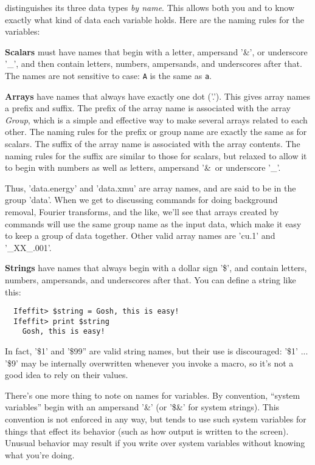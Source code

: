 \documentclass[11pt]{article}
\begin{document}
{\ifeffit} distinguishes its three data types {\emph{by name}}. This allows
both you and {\ifeffit} to know exactly what kind of data each variable
holds.  Here are the naming rules for the variables:

{\bf{Scalars}} must have names that begin with a letter, ampersand '\&', or
underscore '\_', and then contain letters, numbers, ampersands, and
underscores after that.  The names are not sensitive to case: {\tt{A}} is
the same as {\tt{a}}.


{\bf{Arrays}} have names that always have exactly one dot ('.').  This
gives array names a prefix and suffix.  The prefix of the array name is
associated with the array {\emph{Group}}, which is a simple and effective
way to make several arrays related to each other.  The naming rules for the
prefix or group name are exactly the same as for scalars.  The suffix of
the array name is associated with the array contents.  The naming rules for
the suffix are similar to those for scalars, but relaxed to allow it to
begin with numbers as well as letters, ampersand '\&\, or underscore '\_'.

Thus, 'data.energy' and 'data.xmu' are array names, and are said to be in
the group 'data'.  When we get to discussing commands for doing background
removal, Fourier transforms, and the like, we'll see that arrays created by
{\ifeffit} commands will use the same group name as the input data, which
make it easy to keep a group of data together.  Other valid array names are
'cu.1' and '\_XX\_.001'.

{\bf{Strings}} have names that always begin with a dollar sign '\$', and
contain letters, numbers, ampersands, and underscores after that.  You can
define a string like this:
{\small\begin{verbatim}
  Ifeffit> $string = Gosh, this is easy!
  Ifeffit> print $string
    Gosh, this is easy!
\end{verbatim}}\noindent
In fact, '\$1' and '\$99'' are valid string names, but their use is
discouraged: '\$1' ... '\$9' may be internally overwritten whenever you
invoke a macro, so it's not a good idea to rely on their values.

There's one more thing to note on names for variables.  By convention,
``system variables'' begin with an ampersand '\&' (or '\$\&' for system
strings).  This convention is not enforced in any way, but {\ifeffit} tends
to use such system variables for things that effect its behavior (such as
how output is written to the screen).  Unusual behavior may result if you
write over system variables without knowing what you're doing.
\end{document}
